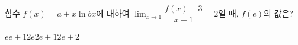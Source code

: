 함수 $f(x)=a+x\ln bx$에 대하여 $\displaystyle\lim_{x\to 1}\dfrac{f(x)-3}{x-1}=2$일 때, $f(e)$의 값은? 
\begin{choices32}{$e$}{$e+1$}{$2e$}{$2e+1$}{$2e+2$}\end{choices32}
